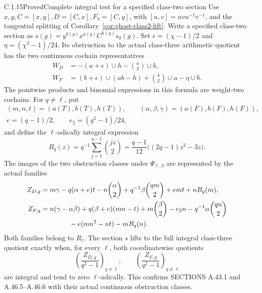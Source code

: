 \begin{result}{C.1.15}{Proved}{Complete integral test for a specified class-two section}
\label{prop:ghost-class3-residue}
Use \(x,y,C=[x,y],D=[C,x],F_3=[C,y]\), with
\([u,v]=uvu^{-1}v^{-1}\), and the tangential splitting of
Corollary~\ref{cor:ghost-class2-lift}. Write a specified
class-two section as
\(s(g)=y^{b(g)}x^{a(g)}C^{h(g)}s_0(g)\).
Set \(\epsilon=(\chi-1)/2\) and
\(\eta=(\chi^2-1)/24\). Its obstruction to the actual
class-three arithmetic quotient has the two continuous
cochain representatives
\[
 \begin{split}
 W_D&=-(a+\epsilon)\cup h-\binom a2\cup b,\\
 W_F&=(b+\epsilon)\cup(ab-h)+\binom b2\cup a-\eta\cup b.
 \end{split}
\]
The pointwise products and binomial expressions in this
formula are weight-two cochains. For \(q\ne\ell\), put
\[
 \begin{gathered}
 (m,n,t)=(a(T),b(T),h(T)),\qquad
 (\alpha,\beta,\gamma)=(a(F),b(F),h(F)),\\
 e=(q-1)/2,\qquad e_2=(q^2-1)/24,
 \end{gathered}
\]
and define the \(\ell\)-adically integral expression
\[
 B_q(z)=q^{-1}\sum_{j=1}^{q-1}\binom{jz}{2}
       =\frac{q-1}{12}\bigl((2q-1)z^2-3z\bigr).
\]
The images of the two obstruction classes under
\(\Psi_{\ell,3}\) are represented by the actual families
\[
 \begin{split}
 Z_{D,q}={}&m\gamma-q(\alpha+e)t-n\binom\alpha2
       +q^{-1}\beta\binom{qm}{2}+emt+nB_q(m),\\
 Z_{F,q}={}&n(\gamma-\alpha\beta)+q(\beta+e)(mn-t)
       +m\binom\beta2-e_2n-q^{-1}\alpha\binom{qn}{2}\\
       &\hspace{10mm}-e(mn^2-nt)-mB_q(n).
 \end{split}
\]
Both families belong to \(R_\ell\). The section \(s\)
lifts to the full integral class-three quotient exactly
when, for every \(\ell\), both coordinatewise quotients
\[
       \left(\frac{Z_{D,q}}{q^2-1}\right)_{q\ne\ell},
       \qquad
       \left(\frac{Z_{F,q}}{q^2-1}\right)_{q\ne\ell}
\]
are integral and tend to zero \(\ell\)-adically.
This confirms SECTIONS A.43.1 and A.46.5--A.46.6 with
their actual continuous obstruction classes.
\end{result}
